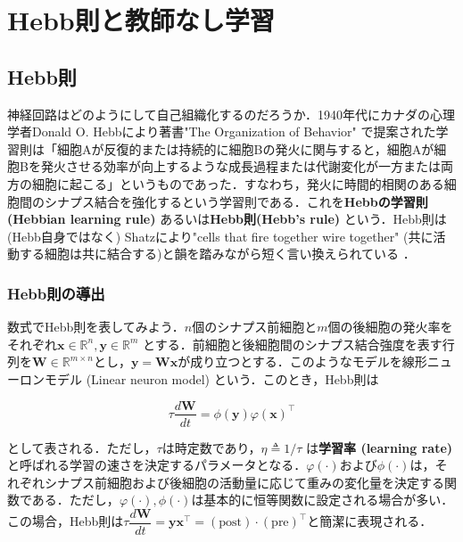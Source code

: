 \section{Hebb則と教師なし学習}
\subsection{Hebb則}
神経回路はどのようにして自己組織化するのだろうか．1940年代にカナダの心理学者Donald O. Hebbにより著書"The Organization of Behavior"\citep{Hebb1949-iv} で提案された学習則は「細胞Aが反復的または持続的に細胞Bの発火に関与すると，細胞Aが細胞Bを発火させる効率が向上するような成長過程または代謝変化が一方または両方の細胞に起こる」というものであった．すなわち，発火に時間的相関のある細胞間のシナプス結合を強化するという学習則である．これを\textbf{Hebbの学習則 (Hebbian learning rule)} あるいは\textbf{Hebb則(Hebb's rule)} という．Hebb則は (Hebb自身ではなく) Shatzにより"cells that fire together wire together" (共に活動する細胞は共に結合する)と韻を踏みながら短く言い換えられている \citep{Shatz1992-he}．

\subsubsection{Hebb則の導出}
数式でHebb則を表してみよう．$n$個のシナプス前細胞と$m$個の後細胞の発火率をそれぞれ$\mathbf{x}\in \mathbb{R}^n, \mathbf{y}\in \mathbb{R}^m$ とする．前細胞と後細胞間のシナプス結合強度を表す行列を$\mathbf{W}\in \mathbb{R}^{m\times n}$とし，$\mathbf{y}=\mathbf{W}\mathbf{x}$が成り立つとする．このようなモデルを線形ニューロンモデル (Linear neuron model) という．このとき，Hebb則は


\begin{equation}
\tau\frac{d\mathbf{W}}{dt}=\phi(\mathbf{y})\varphi(\mathbf{x})^\top
\end{equation}


として表される．ただし，$\tau$は時定数であり，$\eta\triangleq1/\tau$ は\textbf{学習率 (learning rate)} と呼ばれる学習の速さを決定するパラメータとなる．$\varphi(\cdot)$および$\phi(\cdot)$は，それぞれシナプス前細胞および後細胞の活動量に応じて重みの変化量を決定する関数である．ただし，$\varphi(\cdot), \phi(\cdot)$は基本的に恒等関数に設定される場合が多い．この場合，Hebb則は$
\tau\dfrac{d\mathbf{W}}{dt}=\mathbf{y}\mathbf{x}^\top=(\text{post})\cdot (\text{pre})^\top
$と簡潔に表現される．

